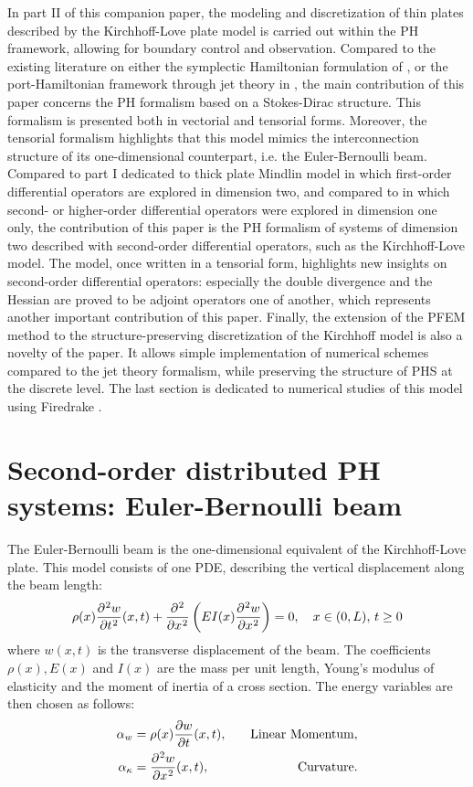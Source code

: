 \documentclass[preprint,12pt]{elsarticle}
\newcommand{\revOne}[1]{\textcolor{blue!80!black}{#1}}
\newcommand{\revTwo}[1]{\textcolor{red!80!black}{#1}}
\begin{document}
In part II of this companion paper, the modeling and discretization of thin plates described by the Kirchhoff-Love plate model is carried out within the PH framework, allowing for boundary control and observation. Compared to the existing literature on either the symplectic Hamiltonian formulation of  \cite{LI2016984,LI2018310}, or the port-Hamiltonian framework through jet theory in \revOne{\cite{jetMin,jetKirchh}}, the main contribution of this paper concerns the PH formalism based on a Stokes-Dirac structure. This formalism is presented both in vectorial and tensorial forms.  Moreover, the tensorial formalism \cite[Chapter~16]{Grinfield} highlights that this model mimics the interconnection structure of its one-dimensional counterpart, i.e. the Euler-Bernoulli beam. Compared to part I dedicated to thick plate Mindlin model in which first-order differential operators are explored in dimension two, and compared to \cite{LeGorrec2005} in which second-  or higher-order differential operators were explored in dimension one only, the contribution of this paper is the PH formalism of systems of dimension two described with second-order  differential operators, such as the Kirchhoff-Love  model. The model, once written in a tensorial form, highlights new insights on second-order differential operators: especially the double divergence and the Hessian are proved to be adjoint operators one of another, which represents another important contribution of this paper.
Finally, the extension of the PFEM method  to the structure-preserving discretization of the Kirchhoff model  is also a novelty of the paper. It allows simple implementation of numerical schemes compared to the jet theory formalism, while preserving the structure of PHS at the discrete level. \revTwo{The last section is dedicated to numerical studies of this model using Firedrake \cite{firedrake}.}

\section{Second-order distributed PH systems: Euler-Bernoulli beam}	
The Euler-Bernoulli beam is the one-dimensional equivalent of the Kirchhoff-Love plate.  This model consists of one PDE, describing the vertical displacement along the beam length:
\begin{equation}
\rho(x) \diffp[2]{w}{t}(x,t) + \displaystyle \diffp[2]{}{x} \left( EI(x) \diffp[2]{w}{x} \right) = 0, \quad x \in (0,L),\, t \ge 0 
\end{equation}
where ${w}(x,t)$ is the transverse displacement of the beam. The coefficients $\rho(x), E(x)$ and $I(x)$  are the mass per unit length, Young's modulus of elasticity and the moment of inertia of a cross section. The energy variables are then chosen as follows:
\begin{equation}
\begin{aligned}
\alpha_{w} &= \rho(x) \diffp{w}{t}(x,t),  &\quad \text{Linear Momentum},\\
\alpha_{\kappa} &= \diffp[2]{w}{x}(x,t), &\quad \text{Curvature}. \\
\end{aligned}
\end{equation}
\end{document}
